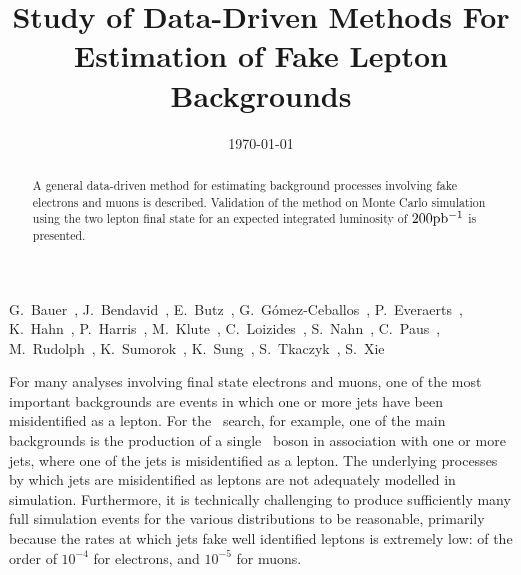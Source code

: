 \documentclass{cmspaper}
\begin{document}
%
\begin{titlepage}
\date{\today}
\title{Study of Data-Driven Methods For Estimation of Fake Lepton Backgrounds}
\begin{Authlist}

%
G.~Bauer~,
J.~Bendavid~,
E.~Butz~,
G.~G\'omez-Ceballos~, 
P.~Everaerts~,
K.~Hahn~,
P.~Harris~,
M.~Klute~,
C.~Loizides~,
S.~Nahn~,
C.~Paus~,
M.~Rudolph~,
K.~Sumorok~,
K.~Sung~,
S.~Tkaczyk~,
S.~Xie~
%
\end{Authlist}


\begin{abstract}
A general data-driven method for estimating background processes involving fake electrons and muons is described. Validation of the method on Monte Carlo simulation using the two lepton final state for an expected integrated luminosity of $200\mathrm{pb^{-1}}$ is presented.

\end{abstract}
\end{titlepage}
%
\tableofcontents
\newpage
%

For many analyses involving final state electrons and muons, one of the most important backgrounds are events in which one or more jets have been misidentified as a lepton. For the \HiggsToWW\ search, for example, one of the main backgrounds is the production of a single \WPM\ boson in association with one or more jets, where one of the jets is misidentified as a lepton. The underlying processes by which jets are misidentified as leptons are not adequately modelled in simulation. Furthermore, it is technically challenging to produce sufficiently many full simulation events for the various distributions to be reasonable, primarily because the rates at which jets fake well identified leptons is extremely low: of the order of $10^{-4}$ for electrons, and $10^{-5}$ for muons.
\end{document}
